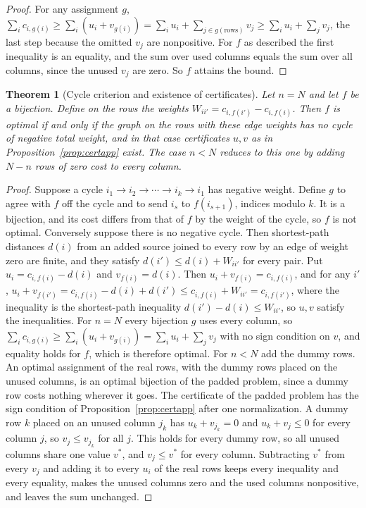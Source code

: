 \documentclass[11pt,twoside,openright]{book}
\theoremstyle{plain}
\newtheorem{theorem}{Theorem}[chapter]
\theoremstyle{definition}
\theoremstyle{remark}
\begin{document}
\begin{proof}
For any assignment $g$, $\sum_ic_{i,g(i)}\ge\sum_i(u_i+v_{g(i)})=\sum_iu_i+\sum_{j\in g(\text{rows})}v_j\ge\sum_iu_i+\sum_jv_j$, the last step because the omitted $v_j$ are nonpositive. For $f$ as described the first inequality is an equality, and the sum over used columns equals the sum over all columns, since the unused $v_j$ are zero. So $f$ attains the bound.
\end{proof}

\begin{theorem}[Cycle criterion and existence of certificates]\label{thm:cycleapp}
Let $n=N$ and let $f$ be a bijection. Define on the rows the weights $W_{ii'}=c_{i,f(i')}-c_{i,f(i)}$. Then $f$ is optimal if and only if the graph on the rows with these edge weights has no cycle of negative total weight, and in that case certificates $u,v$ as in Proposition~\ref{prop:certapp} exist. The case $n<N$ reduces to this one by adding $N-n$ rows of zero cost to every column.
\end{theorem}

\begin{proof}
Suppose a cycle $i_1\to i_2\to\cdots\to i_k\to i_1$ has negative weight. Define $g$ to agree with $f$ off the cycle and to send $i_s$ to $f(i_{s+1})$, indices modulo $k$. It is a bijection, and its cost differs from that of $f$ by the weight of the cycle, so $f$ is not optimal. Conversely suppose there is no negative cycle. Then shortest-path distances $d(i)$ from an added source joined to every row by an edge of weight zero are finite, and they satisfy $d(i')\le d(i)+W_{ii'}$ for every pair. Put $u_i=c_{i,f(i)}-d(i)$ and $v_{f(i)}=d(i)$. Then $u_i+v_{f(i)}=c_{i,f(i)}$, and for any $i'$, $u_i+v_{f(i')}=c_{i,f(i)}-d(i)+d(i')\le c_{i,f(i)}+W_{ii'}=c_{i,f(i')}$, where the inequality is the shortest-path inequality $d(i')-d(i)\le W_{ii'}$, so $u,v$ satisfy the inequalities. For $n=N$ every bijection $g$ uses every column, so $\sum_ic_{i,g(i)}\ge\sum_i(u_i+v_{g(i)})=\sum_iu_i+\sum_jv_j$ with no sign condition on $v$, and equality holds for $f$, which is therefore optimal. For $n<N$ add the dummy rows. An optimal assignment of the real rows, with the dummy rows placed on the unused columns, is an optimal bijection of the padded problem, since a dummy row costs nothing wherever it goes. The certificate of the padded problem has the sign condition of Proposition~\ref{prop:certapp} after one normalization. A dummy row $k$ placed on an unused column $j_k$ has $u_k+v_{j_k}=0$ and $u_k+v_j\le0$ for every column $j$, so $v_j\le v_{j_k}$ for all $j$. This holds for every dummy row, so all unused columns share one value $v^\ast$, and $v_j\le v^\ast$ for every column. Subtracting $v^\ast$ from every $v_j$ and adding it to every $u_i$ of the real rows keeps every inequality and every equality, makes the unused columns zero and the used columns nonpositive, and leaves the sum unchanged.
\end{proof}
\end{document}
